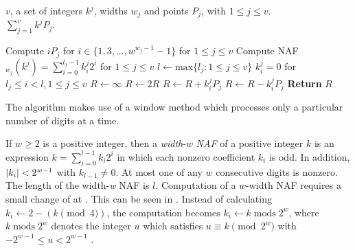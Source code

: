 \begin{algorithm}
	\algorithmicrequire  $v$, a set of integers $k^j$, widths $w_j$ and points $P_j$, with $1 \le j \le v$.\\
	\algorithmicensure $\sum_{j = 1}^{v} k^j P_j$.
	\begin{algorithmic}[1]
		\State Compute $iP_j$ for $i \in \{1, 3 , \ldots, w^{w_j - 1} - 1\}$ for $1 \le j \le v$
		\State Compute NAF$_{w_j} (k^j) = \sum_{i = 0}^{l_j - 1} k_i^j 2^i$ for $1 \le j \le v$
		\State $l \gets \text{max} \{l_j : 1 \le j \le v \}$ 
		\State $k_i^j = 0$ for $l_j \le i < l, 1 \le j \le v$
		\State $R \gets \infty$
			\State $R \gets 2R$
						\State $R \gets R + k_i^j P_j$
					\Else
						\State $R \gets R - k_i^j P_j$
					\EndIf
				\EndIf	
			\EndFor
		\EndFor
		\State \textbf{Return} $R$
	\end{algorithmic}
	\label{algo: interleaving with NAFs}
\end{algorithm}
%
The algorithm makes use of a window method which processes only a particular number of digits at a time.

If $w \ge 2$ is a positive integer, then a \emph{width}-$w$ \emph{NAF} of a positive integer $k$ is an expression $k = \sum_{i = 0}^{l - 1} k_i 2^i$ in which each nonzero coefficient $k_i$ is odd. 
In addition, $\abs{k_i} < 2^{w - 1}$ with $k_{l - 1} \neq 0$. 
At most one of any $w$ consecutive digits is nonzero. The length of the width-\emph{w} NAF is $l$. 
Computation of a $w$-width NAF requires a small change of  at . This can be seen in .
Instead of calculating $k_i \gets 2 - (k \pmod{4})$, the computation becomes $k_i \gets k \operatorname{mods}{2^w}$, where $ k \operatorname{mods}{2^w}$ denotes the integer $u$ which satisfies $u \equiv k \pmod{2^w}$ with $-2^{w-1} \le u < 2^{w - 1}$ \cite{hankerson2006guide}.

